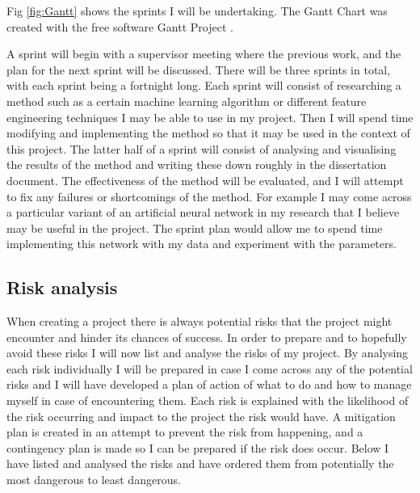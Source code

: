 \documentclass{article}
\begin{document}
Fig \ref{fig:Gantt} shows the sprints I will be undertaking.
The Gantt Chart was created with the free software Gantt Project \cite{GanttProject}.

A sprint will begin with a supervisor meeting where the previous work, and the plan for the next sprint will be discussed.
There will be three sprints in total, with each sprint being a fortnight long.
Each sprint will consist of researching a method such as a certain machine learning algorithm or different feature engineering techniques I may be able to use in my project.
Then I will spend time modifying and implementing the method so that it may be used in the context of this project.
The latter half of a sprint will consist of analysing and visualising the results of the method and writing these down roughly in the dissertation document.
The effectiveness of the method will be evaluated, and I will attempt to fix any failures or shortcomings of the method.
For example I may come across a particular variant of an artificial neural network in my research that I believe may be useful in the project.
The sprint plan would allow me to spend time implementing this network with my data and experiment with the parameters.  




\subsection{Risk analysis}
When creating a project there is always potential risks that the project might encounter and hinder its chances of success. 
In order to prepare and to hopefully avoid these risks I will now list and analyse the risks of my project. 
By analysing each risk individually I will be prepared in case I come across any of the potential risks and I will have developed a plan of action of what to do and how to manage myself in case of encountering them. 
Each risk is explained with the likelihood of the risk occurring and impact to the project the risk would have.
A mitigation plan is created in an attempt to prevent the risk from happening, and a contingency plan is made so I can be prepared if the risk does occur.
Below I have listed and analysed the risks and have ordered them from potentially the most dangerous to least dangerous. 
\end{document}
